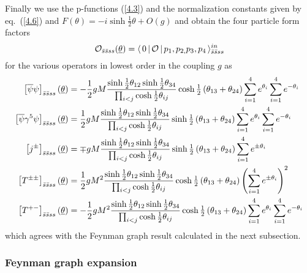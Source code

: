\documentclass[a4paper,a4paper]{article}
\begin{document}
Finally we use the p-functions (\ref{4.3}) and the normalization constants
given by eq.~(\ref{4.6}) and $F(\theta )=-i\sinh \frac{1}{2}\theta +O(g)$
and obtain the four particle form factors 
\[
\mathcal{O}_{\bar{s}\bar{s}ss}(\underline{\theta })=\langle \,0\,|\,\mathcal{%
O}\,|\,p_{1},p_{2,}p_{3},p_{4}\,\rangle _{\bar{s}\bar{s}ss}^{in} 
\]
for the various operators in lowest order in the coupling $g$ as 
\begin{align*}
\left[ \overline{\psi }\psi \right] _{\bar{s}\bar{s}ss}(\underline{\theta }%
)& =-\frac{1}{2}gM\frac{\sinh \tfrac{1}{2}\theta _{12}\sinh \tfrac{1}{2}%
\theta _{34}}{\prod_{i<j}\cosh \tfrac{1}{2}\theta _{ij}}\cosh \tfrac{1}{2}%
\left( \theta _{13}+\theta _{24}\right) \sum_{i=1}^{4}e^{\theta
_{i}}\sum_{i=1}^{4}e^{-\theta _{i}} \\
\left[ \overline{\psi }\gamma ^{5}\psi \right] _{\bar{s}\bar{s}ss}(%
\underline{\theta })& =\frac{1}{2}gM\frac{\sinh \tfrac{1}{2}\theta
_{12}\sinh \tfrac{1}{2}\theta _{34}}{\prod_{i<j}\cosh \tfrac{1}{2}\theta
_{ij}}\sinh \tfrac{1}{2}\left( \theta _{13}+\theta _{24}\right)
\sum_{i=1}^{4}e^{\theta _{i}}\sum_{i=1}^{4}e^{-\theta _{i}} \\
\left[ j^{\pm }\right] _{\bar{s}\bar{s}ss}(\underline{\theta })& =\mp gM%
\frac{\sinh \tfrac{1}{2}\theta _{12}\sinh \tfrac{1}{2}\theta _{34}}{%
\prod_{i<j}\cosh \tfrac{1}{2}\theta _{ij}}\sinh \tfrac{1}{2}\left( \theta
_{13}+\theta _{24}\right) \sum_{i=1}^{4}e^{\pm \theta _{i}} \\
\left[ T^{\pm \pm }\right] _{\bar{s}\bar{s}ss}(\underline{\theta })& =\frac{1%
}{2}gM^{2}\frac{\sinh \tfrac{1}{2}\theta _{12}\sinh \tfrac{1}{2}\theta _{34}%
}{\prod_{i<j}\cosh \tfrac{1}{2}\theta _{ij}}\cosh \tfrac{1}{2}\left( \theta
_{13}+\theta _{24}\right) \left( \sum_{i=1}^{4}e^{\pm \theta _{i}}\right)
^{2} \\
\left[ T^{+-}\right] _{\bar{s}\bar{s}ss}(\underline{\theta })& =-\frac{1}{2}%
gM^{2}\frac{\sinh \tfrac{1}{2}\theta _{12}\sinh \tfrac{1}{2}\theta _{34}}{%
\prod_{i<j}\cosh \tfrac{1}{2}\theta _{ij}}\cosh \tfrac{1}{2}\left( \theta
_{13}+\theta _{24}\right) \sum_{i=1}^{4}e^{\theta
_{i}}\sum_{i=1}^{4}e^{-\theta _{i}}
\end{align*}
which agrees with the Feynman graph result calculated in the next subsection.

\subsubsection{Feynman graph expansion}
\end{document}
